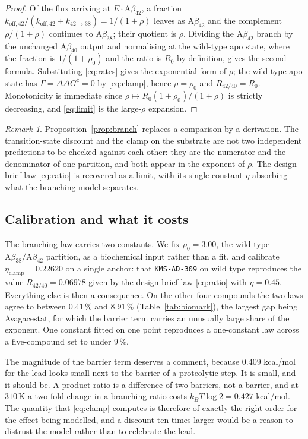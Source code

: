 \documentclass[11pt,reqno]{amsart}
\theoremstyle{plain}
\theoremstyle{definition}
\theoremstyle{remark}
\newtheorem{remark}[theorem]{Remark}
\numberwithin{equation}{section}
\newcommand{\Ab}{\mathrm{A}\beta}
\newcommand{\kT}{k_{B}T}
\newcommand{\lead}{\texttt{KMS-AD-309}}
\begin{document}
\begin{proof}
Of the flux arriving at $E\cdot\Ab_{42}$, a fraction $k_{\mathrm{off},42}/(k_{\mathrm{off},42}+k_{42\to38})=1/(1+\rho)$ leaves as $\Ab_{42}$ and the complement $\rho/(1+\rho)$ continues to $\Ab_{38}$; their quotient is $\rho$. Dividing the $\Ab_{42}$ branch by the unchanged $\Ab_{40}$ output and normalising at the wild-type apo state, where the fraction is $1/(1+\rho_0)$ and the ratio is $R_0$ by definition, gives the second formula. Substituting \eqref{eq:rates} gives the exponential form of $\rho$; the wild-type apo state has $\Gamma=\Delta\Delta G^{\ddagger}=0$ by \eqref{eq:clamp}, hence $\rho=\rho_0$ and $R_{42/40}=R_0$. Monotonicity is immediate since $\rho\mapsto R_0(1+\rho_0)/(1+\rho)$ is strictly decreasing, and \eqref{eq:limit} is the large-$\rho$ expansion.
\end{proof}

\begin{remark}
Proposition~\ref{prop:branch} replaces a comparison by a derivation. The transition-state discount and the clamp on the substrate are not two independent predictions to be checked against each other: they are the numerator and the denominator of one partition, and both appear in the exponent of $\rho$. The design-brief law \eqref{eq:ratio} is recovered as a limit, with its single constant $\eta$ absorbing what the branching model separates.
\end{remark}

\subsection{Calibration and what it costs}
The branching law carries two constants. We fix $\rho_0=3.00$, the wild-type $\Ab_{38}/\Ab_{42}$ partition, as a biochemical input rather than a fit, and calibrate $\eta_{\mathrm{clamp}}=0.22620$ on a single anchor: that \lead{} on wild type reproduces the value $R_{42/40}=0.06978$ given by the design-brief law \eqref{eq:ratio} with $\eta=0.45$. Everything else is then a consequence. On the other four compounds the two laws agree to between $0.41\,\%$ and $8.91\,\%$ (Table~\ref{tab:biomark}), the largest gap being Avagacestat, for which the barrier term carries an unusually large share of the exponent. One constant fitted on one point reproduces a one-constant law across a five-compound set to under $9\,\%$.

The magnitude of the barrier term deserves a comment, because $0.409$ kcal/mol for the lead looks small next to the barrier of a proteolytic step. It is small, and it should be. A product ratio is a difference of two barriers, not a barrier, and at $310$\,K a two-fold change in a branching ratio costs $\kT\log2=0.427$ kcal/mol. The quantity that \eqref{eq:clamp} computes is therefore of exactly the right order for the effect being modelled, and a discount ten times larger would be a reason to distrust the model rather than to celebrate the lead.
\end{document}
